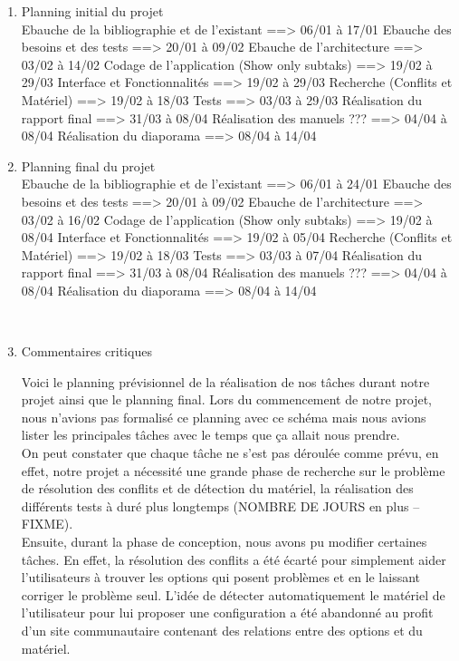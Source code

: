 \documentclass[16pts]{report}
\begin{document}
\begin{enumerate}
	\item Planning initial du projet
	\\
	Ebauche de la bibliographie et de l'existant	==> 06/01 à 17/01
	Ebauche des besoins et des tests				==> 20/01 à 09/02
	Ebauche de l'architecture						==> 03/02 à 14/02
	Codage de l'application	(Show only subtaks)		==> 19/02 à 29/03
		Interface et Fonctionnalités				==> 19/02 à 29/03
		Recherche (Conflits et Matériel)			==> 19/02 à 18/03
		Tests										==> 03/03 à 29/03
	Réalisation du rapport final					==> 31/03 à 08/04
	Réalisation des manuels ???						==> 04/04 à 08/04
	Réalisation du diaporama						==> 08/04 à 14/04


	\item Planning final du projet
	\\
	Ebauche de la bibliographie et de l'existant	==> 06/01 à 24/01
	Ebauche des besoins et des tests				==> 20/01 à 09/02
	Ebauche de l'architecture						==> 03/02 à 16/02
	Codage de l'application	(Show only subtaks)		==> 19/02 à 08/04
		Interface et Fonctionnalités				==> 19/02 à 05/04
		Recherche (Conflits et Matériel)			==> 19/02 à 18/03
		Tests										==> 03/03 à 07/04
	Réalisation du rapport final					==> 31/03 à 08/04
	Réalisation des manuels ???						==> 04/04 à 08/04
	Réalisation du diaporama						==> 08/04 à 14/04

	\\

	\item Commentaires critiques

	Voici le planning prévisionnel de la réalisation de nos tâches durant 
	notre projet ainsi que le planning final. Lors du commencement de notre 
	projet, nous n'avions pas formalisé ce planning avec ce schéma mais nous 
	avions lister les principales tâches avec le temps que ça allait 
	nous prendre.
	\\
	On peut constater que chaque tâche ne s'est pas déroulée comme prévu, 
	en effet, notre projet a nécessité une grande phase de recherche sur le 
	problème de résolution des conflits et de détection du matériel, la 
	réalisation des différents tests à duré plus longtemps 
	(NOMBRE DE JOURS en plus -- FIXME).
	\\
	Ensuite, durant la phase de conception, nous avons pu modifier 
	certaines tâches. En effet, la résolution des conflits a été écarté 
	pour simplement aider l'utilisateurs à trouver les options qui posent 
	problèmes et en le laissant corriger le problème seul. L'idée de détecter 
	automatiquement le matériel de l'utilisateur pour lui proposer une 
	configuration a été abandonné au profit d'un site communautaire 
	contenant des relations entre des options et du matériel.



\end{enumerate}
\end{document}
